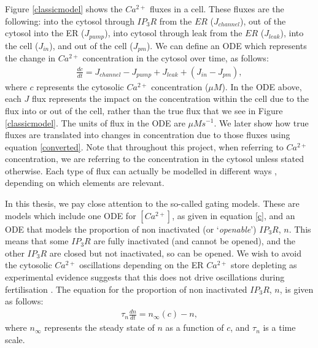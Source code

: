 {Figure \ref{classicmodel} shows the $Ca^{2+}$ fluxes in a cell. These fluxes are the following: into the cytosol through $IP_3R$ from the $ER$ ($J_{channel}$), out of the cytosol into the ER ($J_{pump}$), into cytosol through leak from the $ER$ ($J_{leak}$), into the cell ($J_{in}$), and out of the cell ($J_{pm}$).  We can define an ODE which represents the change in $Ca^{2+}$ concentration in the cytosol over time, as follows:
\begin{align}
    \frac{dc}{dt}=J_{channel}-J_{pump}+J_{leak}+(J_{in}-J_{pm}),\label{c}
\end{align}
where $c$ represents the cytosolic $Ca^{2+}$ concentration ($\mu M$). {In the ODE above, each $J$ flux represents the impact on the concentration within the cell due to the flux into or out of the cell, rather than the true flux that we see in Figure \ref{classicmodel}. The units of flux in the ODE are {$\mu M s^{-1}$}. We later show how true fluxes are translated into changes in concentration due to those fluxes using equation \eqref{converted}. } Note that throughout this project, when referring to $Ca^{2+}$ concentration, we are referring to the concentration in the cytosol unless stated otherwise. Each type of flux can actually be modelled in different ways \cite{sneyd2007}, depending on which elements are relevant. 

In this thesis, we pay close attention to the so-called gating models. These are models which include one ODE for $[Ca^{2+}]$, as given in equation \eqref{c}, and an ODE that models the proportion of non inactivated (or `\textit{openable}') $IP_3R$, $n$. This means that some $IP_3R$ are fully inactivated (and cannot be opened), and the other $IP_3R$ are closed but not inactivated, so can be opened. We wish to avoid the cytosolic $Ca^{2+}$ oscillations depending on the ER $Ca^{2+}$ store depleting as experimental evidence suggests that this does not drive oscillations during fertilisation . The equation for the proportion of non inactivated $IP_3R$, $n$, is given as follows:
\begin{align}
    \tau_n\frac{dn}{dt}=n_{\infty}(c)-n,\label{n}
\end{align}
where $n_{\infty}$ represents the steady state of $n$ as a function of $c$, and $\tau_n$ is a time scale.

}
